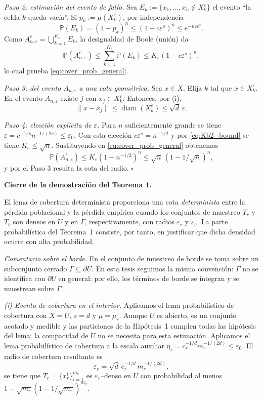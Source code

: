 \smallskip
\noindent\textit{Paso 2: estimación del evento de fallo.}
Sea $E_k:=\{x_1,\dots,x_n\notin X_k^\varepsilon\}$ el evento ``la celda $k$ queda vacía''.
Si $p_k:=\mu(X_k^\varepsilon)$, por independencia
\[
\mathbb{P}(E_k)=(1-p_k)^n\le (1-c\varepsilon^s)^n\le e^{-n c\varepsilon^s}.
\]
Como $A_{n,\varepsilon}^c=\bigcup_{k=1}^{K_\varepsilon}E_k$, la desigualdad de Boole (unión) da
\[
\mathbb{P}(A_{n,\varepsilon}^c)\le \sum_{k=1}^{K_\varepsilon}\mathbb{P}(E_k)\le K_\varepsilon(1-c\varepsilon^s)^n,
\]
lo cual prueba \eqref{eq:cover_prob_general}.

\smallskip
\noindent\textit{Paso 3: del evento $A_{n,\varepsilon}$ a una cota geométrica.}
Sea $x\in X$. Elija $k$ tal que $x\in X_k^\varepsilon$. En el evento $A_{n,\varepsilon}$ existe $j$ con $x_j\in X_k^\varepsilon$.
Entonces, por (i),
\[
\|x-x_j\|\le \operatorname{diam}(X_k^\varepsilon)\le \sqrt d\,\varepsilon.
\]

\smallskip
\noindent\textit{Paso 4: elección explícita de $\varepsilon$.}
Para $n$ suficientemente grande se tiene $\varepsilon=c^{-1/s}n^{-1/(2s)}\leq\varepsilon_0$.
Con esta elección $c\varepsilon^s=n^{-1/2}$ y por \eqref{eq:Kb2_bound} se tiene $K_\varepsilon\le \sqrt n$.
Sustituyendo en \eqref{eq:cover_prob_general} obtenemos
\[
\mathbb{P}(A_{n,\varepsilon}^c)\le K_\varepsilon(1-n^{-1/2})^n\le \sqrt n\,(1-1/\sqrt n)^n,
\]
y por el Paso 3 resulta la cota del radio. \hfill $\square$


\medskip
\noindent\textbf{Cierre de la demostración del Teorema 1.}

El lema de cobertura determinista proporciona una cota \emph{determinista} entre la pérdida poblacional y la pérdida empírica
cuando los conjuntos de muestreo $T_r$ y $T_b$ son densos en $U$ y en $\Gamma$, respectivamente,
con radios $\varepsilon_r$ y $\varepsilon_b$.
La parte probabilística del Teorema~1 consiste, por tanto, en justificar que dicha densidad ocurre con alta probabilidad.

\medskip
\noindent\emph{Comentario sobre el borde.}
En \cite{shin2020convergence} el conjunto de muestreo de borde se toma sobre un subconjunto cerrado
$\Gamma\subseteq\partial U$. En esta tesis seguimos la misma convención: $\Gamma$ no se identifica con $\partial U$ en general; por ello, los términos de borde se integran y se muestrean
sobre $\Gamma$.

\smallskip
\noindent\textit{(i) Evento de cobertura en el interior.}
Aplicamos el lema probabilístico de cobertura con $X=U$, $s=d$ y $\mu=\mu_r$.
Aunque $U$ es abierto, es un conjunto acotado y medible y las particiones de la Hipótesis~1 cumplen todas las hipótesis del lema; la compacidad de $U$ no se necesita para esta estimación. Aplicamos el lema probabilístico de cobertura a la escala auxiliar $\eta_r=c_r^{-1/d}m_r^{-1/(2d)}\leq\varepsilon_0$.
El radio de cobertura resultante es
\[
\varepsilon_r=\sqrt d\,c_r^{-1/d}\,m_r^{-1/(2d)},
\]
se tiene que $T_r=\{x_r^i\}_{i=1}^{m_r}$ es $\varepsilon_r$--denso en $U$ con probabilidad al menos
$1-\sqrt{m_r}(1-1/\sqrt{m_r})^{m_r}$.

